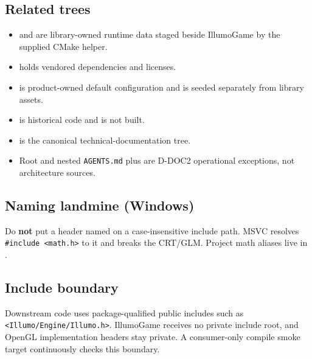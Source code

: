 \subsection{Related trees}
\begin{itemize}
  \item {} and  are library-owned
        runtime data staged beside IllumoGame by the supplied CMake helper.
  \item {} holds vendored dependencies and licenses.
  \item {} is product-owned default configuration
        and is seeded separately from library assets.
  \item {} is historical code and is not built.
  \item {} is the canonical technical-documentation tree.
  \item Root and nested \texttt{AGENTS.md} plus  are D-DOC2
        operational exceptions, not architecture sources.
\end{itemize}

\subsection{Naming landmine (Windows)}
\begin{decisionbox}[title={Decision: MathTypes.h (2026-07-28)}]
Do \textbf{not} put a header named  on a case-insensitive include
path. MSVC resolves \texttt{\#include <math.h>} to it and breaks the CRT/GLM.
Project math aliases live in .
\end{decisionbox}

\subsection{Include boundary}
Downstream code uses package-qualified public includes such as
\texttt{<Illumo/Engine/Illumo.h>}. IllumoGame receives no private
 include root, and OpenGL implementation headers stay
private. A consumer-only compile smoke target continuously checks this boundary.
